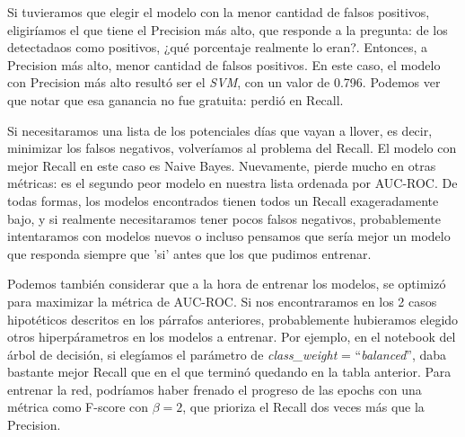 \documentclass[12pt]{article}
\numberwithin{equation}{section}
\numberwithin{figure}{section}
\numberwithin{table}{section}
\begin{document}
	Si tuvieramos que elegir el modelo con la menor cantidad de falsos positivos,
	eligiríamos el que tiene el Precision más alto, que responde a la pregunta:
	de los detectadaos como positivos, ¿qué porcentaje realmente lo eran?. Entonces,
	a Precision más alto, menor cantidad de falsos positivos. En este caso, el
	modelo con Precision más alto resultó ser el \textit{SVM}, con un valor de 
	0.796. Podemos ver que notar que esa ganancia no fue gratuita: perdió en Recall.

	Si necesitaramos una lista de los potenciales días que vayan a llover, es decir,
	minimizar los falsos negativos, volveríamos al problema del Recall. El modelo
	con mejor Recall en este caso es Naive Bayes. Nuevamente, pierde mucho en otras
	métricas: es el segundo peor modelo en nuestra lista ordenada por AUC-ROC. De
	todas formas, los modelos encontrados tienen todos un Recall exageradamente bajo, y
	si realmente necesitaramos tener pocos falsos negativos, probablemente intentaramos
	con modelos nuevos o incluso pensamos que sería mejor un modelo que responda siempre
	que 'si' antes que los que pudimos entrenar.

	Podemos también considerar que a la hora de entrenar los modelos, se optimizó para 
	maximizar la métrica de AUC-ROC. Si nos encontraramos en los 2 casos hipotéticos
	descritos en los párrafos anteriores, probablemente hubieramos elegido otros
	hiperpárametros en los modelos a entrenar. Por ejemplo, en el notebook del 
	árbol de decisión, si elegíamos el parámetro de \textit{class\_weight} = 
	``\textit{balanced}'', daba bastante mejor Recall que en el que terminó quedando en la
	tabla anterior. Para entrenar la red, podríamos haber frenado el progreso de las epochs
	con una métrica como F-score con $\beta = 2$, que prioriza el Recall dos veces más que
	la Precision.

	
\end{document}
